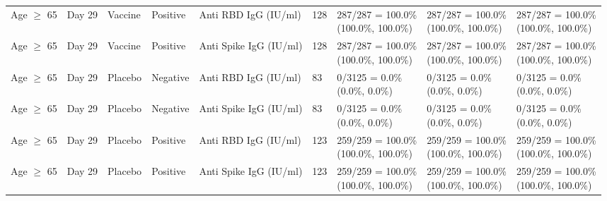 \documentclass[]{book}
\theoremstyle{definition}
\theoremstyle{definition}
\theoremstyle{definition}
\newcommand{\1}{\mathbbm{1}}
\begin{document}
\begin{landscape}
\begin{ThreePartTable}
\begin{longtable}[t]{>{\raggedright\arraybackslash}p{2.7cm}llllllll}
\hspace{1em}Age $\geq$ 65 & Day 29 & Vaccine & Positive & Anti RBD IgG (IU/ml) & 128 & \makecell[l]{287/287 = 100.0\%\\(100.0\%, 100.0\%)} & \makecell[l]{287/287 = 100.0\%\\(100.0\%, 100.0\%)} & \makecell[l]{287/287 = 100.0\%\\(100.0\%, 100.0\%)}\\
\hspace{1em}Age $\geq$ 65 & Day 29 & Vaccine & Positive & Anti Spike IgG (IU/ml) & 128 & \makecell[l]{287/287 = 100.0\%\\(100.0\%, 100.0\%)} & \makecell[l]{287/287 = 100.0\%\\(100.0\%, 100.0\%)} & \makecell[l]{287/287 = 100.0\%\\(100.0\%, 100.0\%)}\\
\hspace{1em}Age $\geq$ 65 & Day 29 & Placebo & Negative & Anti RBD IgG (IU/ml) & 83 & \makecell[l]{0/3125 = 0.0\%\\(0.0\%, 0.0\%)} & \makecell[l]{0/3125 = 0.0\%\\(0.0\%, 0.0\%)} & \makecell[l]{0/3125 = 0.0\%\\(0.0\%, 0.0\%)}\\
\hspace{1em}Age $\geq$ 65 & Day 29 & Placebo & Negative & Anti Spike IgG (IU/ml) & 83 & \makecell[l]{0/3125 = 0.0\%\\(0.0\%, 0.0\%)} & \makecell[l]{0/3125 = 0.0\%\\(0.0\%, 0.0\%)} & \makecell[l]{0/3125 = 0.0\%\\(0.0\%, 0.0\%)}\\
\hspace{1em}Age $\geq$ 65 & Day 29 & Placebo & Positive & Anti RBD IgG (IU/ml) & 123 & \makecell[l]{259/259 = 100.0\%\\(100.0\%, 100.0\%)} & \makecell[l]{259/259 = 100.0\%\\(100.0\%, 100.0\%)} & \makecell[l]{259/259 = 100.0\%\\(100.0\%, 100.0\%)}\\
\hspace{1em}Age $\geq$ 65 & Day 29 & Placebo & Positive & Anti Spike IgG (IU/ml) & 123 & \makecell[l]{259/259 = 100.0\%\\(100.0\%, 100.0\%)} & \makecell[l]{259/259 = 100.0\%\\(100.0\%, 100.0\%)} & \makecell[l]{259/259 = 100.0\%\\(100.0\%, 100.0\%)}\\

\end{longtable}
\end{ThreePartTable}
\end{landscape}
\end{document}
